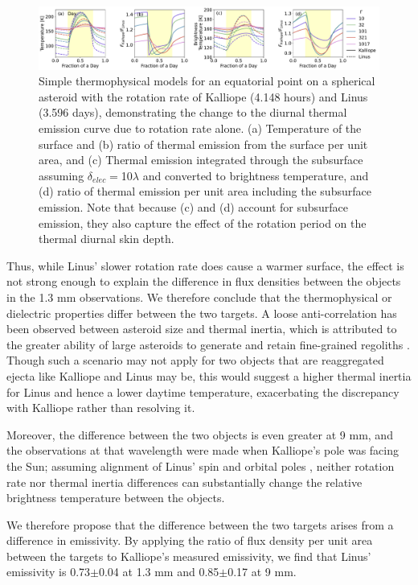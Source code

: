 \documentclass[]{aastex631}
\begin{document}
\begin{figure}[ht!]
\centering
\includegraphics[width=16cm]{TPM_Both_Mar2024.pdf}
\caption{Simple thermophysical models for an equatorial point on a spherical asteroid with the rotation rate of Kalliope (4.148 hours) and Linus (3.596 days), demonstrating the change to the diurnal thermal emission curve due to rotation rate alone. (a) Temperature of the surface and (b) ratio of thermal emission from the surface per unit area, and (c) Thermal emission integrated through the subsurface assuming $\delta_{elec}=$10$\lambda$ and converted to brightness temperature, and (d) ratio of thermal emission per unit area including the subsurface emission. Note that because (c) and (d) account for subsurface emission, they also capture the effect of the rotation period on the thermal diurnal skin depth.\label{fig:TPM}}
\end{figure}

Thus, while Linus' slower rotation rate does cause a warmer surface, the effect is not strong enough to explain the difference in flux densities between the objects in the 1.3 mm observations. We therefore conclude that the thermophysical or dielectric properties differ between the two targets. A loose anti-correlation has been observed between asteroid size and thermal inertia, which is attributed to the greater ability of large asteroids to generate and retain fine-grained regoliths \citep{delbo2007,hung2022}. Though such a scenario may not apply for two objects that are reaggregated ejecta like Kalliope and Linus may be, this would suggest a higher thermal inertia for Linus and hence a lower daytime temperature, exacerbating the discrepancy with Kalliope rather than resolving it. 

Moreover, the difference between the two objects is even greater at 9 mm, and the observations at that wavelength were made when Kalliope's pole was facing the Sun; assuming alignment of Linus' spin and orbital poles \citep{margot2003}, neither rotation rate nor thermal inertia differences can substantially change the relative brightness temperature between the objects. 

We therefore propose that the difference between the two targets arises from a difference in emissivity. By applying the ratio of flux density per unit area between the targets to Kalliope's measured emissivity, we find that Linus' emissivity is 0.73$\pm$0.04 at 1.3 mm and 0.85$\pm$0.17 at 9 mm.
\end{document}
